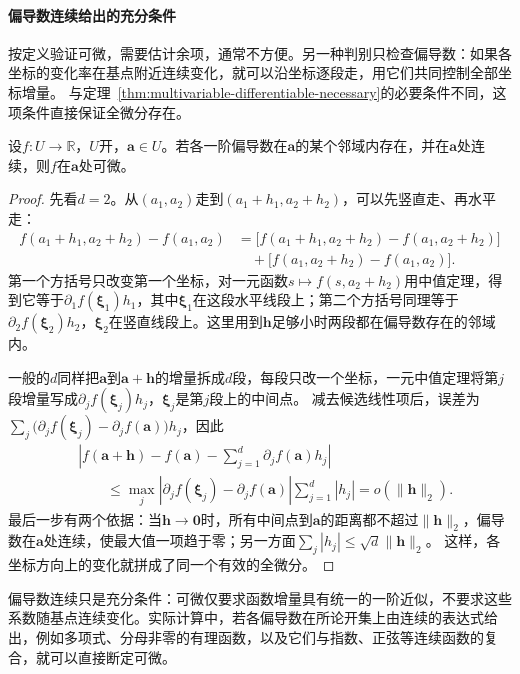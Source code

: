 \paragraph{偏导数连续给出的充分条件}
按定义验证可微，需要估计余项，通常不方便。另一种判别只检查偏导数：如果各坐标的变化率在基点附近连续变化，就可以沿坐标逐段走，用它们共同控制全部坐标增量。
与定理~\ref{thm:multivariable-differentiable-necessary}的必要条件不同，这项条件直接保证全微分存在。
\begin{theorem}[偏导数连续与可微性]
\label{thm:multivariable-continuous-partials-sufficient}
设$f:U\to\mathbb R$，$U$开，$\bm a\in U$。若各一阶偏导数在$\bm a$的某个邻域内存在，并在$\bm a$处连续，则$f$在$\bm a$处可微。
\end{theorem}
\begin{proof}
先看$d=2$。从$(a_1,a_2)$走到$(a_1+h_1,a_2+h_2)$，可以先竖直走、再水平走：
\[
 \begin{aligned}
 f(a_1+h_1,a_2+h_2)-f(a_1,a_2)
 &=\bigl[f(a_1+h_1,a_2+h_2)-f(a_1,a_2+h_2)\bigr]\\
 &\quad+\bigl[f(a_1,a_2+h_2)-f(a_1,a_2)\bigr].
 \end{aligned}
\]
第一个方括号只改变第一个坐标，对一元函数$s\mapsto f(s,a_2+h_2)$用中值定理，得到它等于$\partial_1f(\bm\xi_1)h_1$，其中$\bm\xi_1$在这段水平线段上；第二个方括号同理等于$\partial_2f(\bm\xi_2)h_2$，$\bm\xi_2$在竖直线段上。这里用到$\bm h$足够小时两段都在偏导数存在的邻域内。

一般的$d$同样把$\bm a$到$\bm a+\bm h$的增量拆成$d$段，每段只改一个坐标，一元中值定理将第$j$段增量写成$\partial_jf(\bm\xi_j)h_j$，$\bm\xi_j$是第$j$段上的中间点。
减去候选线性项后，误差为$\sum_j\bigl(\partial_jf(\bm\xi_j)-\partial_jf(\bm a)\bigr)h_j$，因此
\[
 \begin{aligned}
 &\left|f(\bm a+\bm h)-f(\bm a)-\sum_{j=1}^d\partial_j f(\bm a)h_j\right|\\
 &\qquad\leq \max_j\left|\partial_j f(\bm\xi_j)-\partial_j f(\bm a)\right|
       \sum_{j=1}^d|h_j|
 =o(\lVert\bm h\rVert_2).
 \end{aligned}
\]
最后一步有两个依据：当$\bm h\to\bm0$时，所有中间点到$\bm a$的距离都不超过$\lVert\bm h\rVert_2$，偏导数在$\bm a$处连续，使最大值一项趋于零；另一方面$\sum_j|h_j|\leq\sqrt d\lVert\bm h\rVert_2$。
这样，各坐标方向上的变化就拼成了同一个有效的全微分。
\end{proof}
偏导数连续只是充分条件：可微仅要求函数增量具有统一的一阶近似，不要求这些系数随基点连续变化。实际计算中，若各偏导数在所论开集上由连续的表达式给出，例如多项式、分母非零的有理函数，以及它们与指数、正弦等连续函数的复合，就可以直接断定可微。


